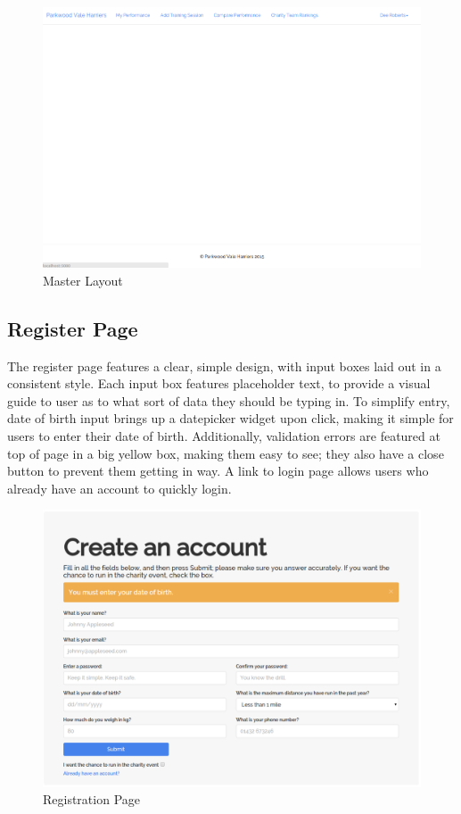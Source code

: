 \documentclass{article}[12pt,a4paper]
\begin{document}
\begin{figure}[h!]
  \includegraphics[scale=0.30]{final_ui/layout}
  \caption{Master Layout}
\end{figure}

\subsection{Register Page}
The register page features a clear, simple design, with input boxes laid out in a consistent style. Each input box features placeholder text, to provide a visual guide to user as to what sort of data they should be typing in. To simplify entry, date of birth input brings up a datepicker widget upon click, making it simple for users to enter their date of birth. Additionally, validation errors are featured at top of page in a big yellow box, making them easy to see; they also have a close button to prevent them getting in way. A link to login page allows users who already have an account to quickly login.

\begin{figure}[h!]
  \includegraphics[scale=0.35]{final_ui/register}
  \caption{Registration Page}
\end{figure}
\clearpage
\end{document}
